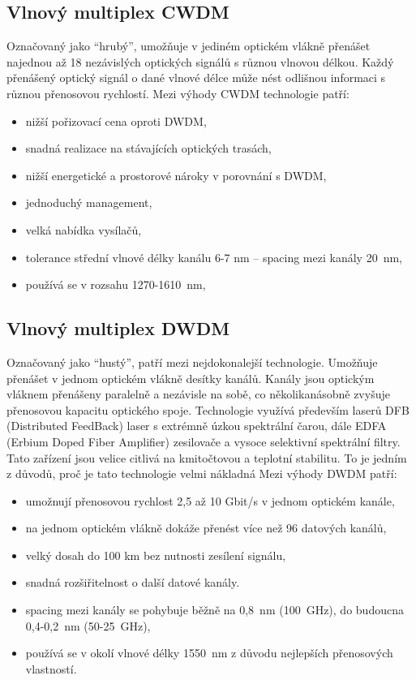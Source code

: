 \subsection{Vlnový multiplex CWDM }
Označovaný jako \enquote{hrubý}, umožňuje v jediném optickém vlákně přenášet najednou až 18 nezávislých optických signálů s různou vlnovou délkou. Každý přenášený optický signál o dané vlnové délce může nést odlišnou informaci s různou přenosovou rychlostí.
Mezi výhody CWDM technologie patří:
\begin{itemize}
    \item nižší pořizovací cena oproti DWDM,
    \item snadná realizace na stávajících optických trasách,
    \item nižší energetické a prostorové nároky v porovnání s DWDM,
    \item jednoduchý management,
    \item velká nabídka vysílačů,
    \item tolerance střední vlnové délky kanálu 6-7 nm -- spacing mezi kanály 20~nm,
    \item používá se v rozsahu 1270-1610~nm,
\end{itemize}

\subsection{Vlnový multiplex DWDM}
Označovaný jako \enquote{hustý}, patří mezi nejdokonalejší technologie. Umožňuje přenášet v jednom optickém vlákně desítky kanálů. Kanály jsou optickým vláknem přenášeny paralelně a nezávisle na sobě, co několikanásobně zvyšuje přenosovou kapacitu optického spoje. Technologie využívá především laserů DFB (Distributed FeedBack) laser s extrémně úzkou spektrální čarou, dále EDFA (Erbium Doped Fiber Amplifier) zesilovače a vysoce selektivní
spektrální filtry. Tato zařízení jsou velice citlivá na kmitočtovou a teplotní stabilitu. To je jedním z důvodů, proč je tato technologie velmi nákladná
Mezi výhody DWDM patří:
\begin{itemize}
    \item umožnují přenosovou rychlost 2,5 až 10 Gbit/s v jednom optickém kanále,
    \item na jednom optickém vlákně dokáže přenést více než 96 datových kanálů,
    \item velký dosah do 100 km bez nutnosti zesílení signálu,
    \item snadná rozšiřitelnost o další datové kanály.
    \item spacing mezi kanály se pohybuje běžně na 0,8~nm (100~GHz), do budoucna 0,4-0,2~nm (50-25~GHz),
    \item používá se v okolí vlnové délky 1550~nm z důvodu nejlepších přenosových vlastností.
\end{itemize}

